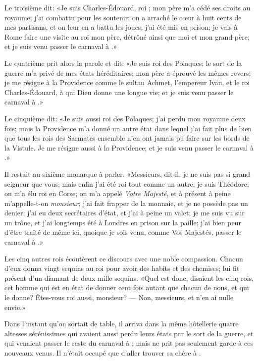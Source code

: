 Le troisième dit: «Je suis Charles-Édouard, roi ;
 mon
père m’a cédé ses droits au royaume; j’ai combattu pour les soutenir;
on a arraché le cœur à huit cents de mes partisans, et on leur en a
battu les joues; j’ai été mis en prison; je vais à Rome faire une
visite au roi mon père, détrôné ainsi que moi et mon grand-père; et je
suis venu passer le carnaval à  .»



Le quatrième prit alors la parole et dit: «Je suis roi des Polaques; le
sort de la guerre m’a privé de mes états héréditaires; mon père a
éprouvé les mêmes revers; je me résigne à la Providence comme le sultan
Achmet, l’empereur Ivan, et le roi Charles-Édouard, à qui Dieu donne
une longue vie; et je suis venu passer le carnaval à  .»



Le cinquième dit: «Je suis aussi roi des Polaques; j’ai perdu mon
royaume deux fois; mais la Providence m’a donné un autre état dans
lequel j’ai fait plus de bien que tous les rois des Sarmates ensemble
n’en ont jamais pu faire sur les bords de la Vistule. Je me résigne
aussi à la Providence; et je suis venu passer le carnaval à  .»



Il restait au sixième monarque à parler. «Messieurs, dit-il, je ne suis
pas si grand seigneur que vous; mais enfin j’ai été roi tout comme un
autre; je suis Théodore; on m’a élu roi en Corse; on m’a appelé
\textit{Votre Majesté}, et à présent à peine m’appelle-t-on \textit{monsieur}; j’ai
fait frapper de la monnaie, et je ne possède pas un denier; j’ai eu
deux secrétaires d’état, et j’ai à peine un valet; je me suis vu sur un
trône, et j’ai longtemps été à Londres en prison sur la paille; j’ai
bien peur d’être traité de même ici, quoique je sois venu, comme Vos
Majestés, passer le carnaval à  .»


Les cinq autres rois écoutèrent ce discours avec une noble compassion.
Chacun d’eux donna vingt sequins au roi  pour avoir des habits
et des chemises;  lui fit présent d’un diamant de deux mille
sequins. «Quel est donc, disaient les cinq rois, cet homme qui est en
état de donner cent fois autant que chacun de nous, et qui le donne?
Êtes-vous roi aussi, monsieur? — Non, messieurs, et n’en ai nulle envie.»

Dans l’instant qu’on sortait de table, il arriva dans la même
hôtellerie quatre altesses sérénissimes qui avaient aussi perdu leurs
états par le sort de la guerre, et qui venaient passer le reste du
carnaval à  ; mais  ne prit pas seulement garde à ces
nouveaux venus. Il n’était occupé que d’aller trouver sa chère
 à .



